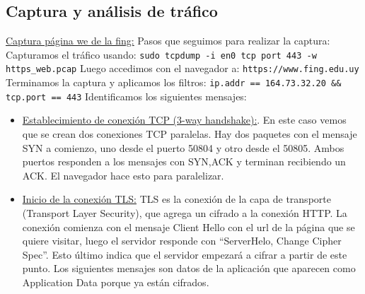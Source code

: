 \documentclass[12pt]{article} %
\begin{document}

\subsection{Captura y análisis de tráfico} %

\underline {Captura página we de la fing:}
\newline
\newline
Pasos que seguimos para realizar la captura:
\newline
Capturamos el tráfico usando: \verb|sudo tcpdump -i en0 tcp port 443 -w https_web.pcap|
\newline
Luego accedimos con el navegador a: \verb|https://www.fing.edu.uy|
\newline
Terminamos la captura y aplicamos los filtros: \verb|ip.addr == 164.73.32.20 && tcp.port == 443|
\newline
\newline
Identificamos los siguientes mensajes:
\begin{itemize}
    \item \underline {Establecimiento de conexión TCP (3-way handshake):}. En este caso vemos que se crean dos conexiones TCP paralelas. Hay dos paquetes con el mensaje SYN a comienzo, uno desde el puerto 50804  y otro desde el 50805. Ambos puertos responden a los mensajes con SYN,ACK y terminan recibiendo un ACK. El navegador hace esto para paralelizar. 
    \item \underline {Inicio de la conexión TLS:} TLS es la conexión de la capa de transporte (Transport Layer Security), que agrega un cifrado a la conexión HTTP. La conexión comienza con el mensaje Client Hello con el url de la página que se quiere visitar, luego el servidor responde con “ServerHelo, Change Cipher Spec”. Esto último indica que el servidor empezará a cifrar a partir de este punto. Los siguientes mensajes son datos de la aplicación que aparecen como Application Data porque ya están cifrados.
\end{itemize}
\end{document}

